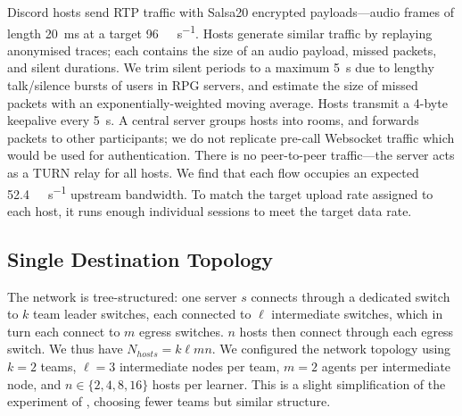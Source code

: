 \documentclass[10pt, times, conference, letterpaper]{IEEEtran}
\begin{document}
Discord hosts send RTP traffic with Salsa20 encrypted payloads---audio frames of length \SI{20}{\milli\second} at a target \SI{96}{\kilo\bit\per\second}.
Hosts generate similar traffic by replaying anonymised traces; each contains the size of an audio payload, missed packets, and silent durations.
We trim silent periods to a maximum \SI{5}{\second} due to lengthy talk/silence bursts of users in RPG servers, and estimate the size of missed packets with an exponentially-weighted moving average.
Hosts transmit a 4-byte keepalive every \SI{5}{\second}.
A central server groups hosts into rooms, and forwards packets to other participants; we do not replicate pre-call Websocket traffic which would be used for authentication.
There is no peer-to-peer traffic---the server acts as a TURN relay for all hosts.
We find that each flow occupies an expected \SI{52.4}{\kilo\bit\per\second} upstream bandwidth.
To match the target upload rate assigned to each host, it runs enough individual sessions to meet the target data rate.


\subsection{Single Destination Topology}\label{sec:single-dest}
The network is tree-structured: one server $s$ connects through a dedicated switch to $k$ team leader switches, each connected to $\ell$ intermediate switches, which in turn each connect to $m$ egress switches.
$n$ hosts then connect through each egress switch.
We thus have $N_{\mathit{hosts}} = k \ell m n$.
We configured the network topology using $k=2$ teams, $\ell=3$ intermediate nodes per team, $m=2$ agents per intermediate node, and $n \in \{2, 4, 8, 16\}$ hosts per learner.
This is a slight simplification of the  experiment of \textcite{DBLP:journals/eaai/MalialisK15}, choosing fewer teams but similar structure.
\end{document}
